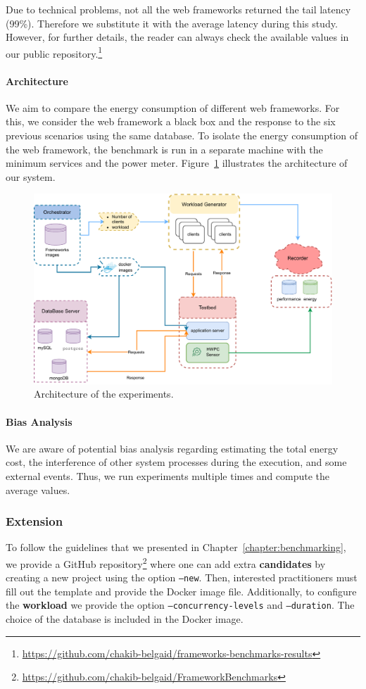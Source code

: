 Due to technical problems, not all the web frameworks returned the tail latency (99\%). Therefore we substitute it with the average latency during this study.
However, for further details, the reader can always check the available values in our public repository.\footnote{\url{https://github.com/chakib-belgaid/frameworks-benchmarks-results}}


\paragraph{Architecture}
We aim to compare the energy consumption of different web frameworks.
For this, we consider the web framework a black box and the response to the six previous scenarios using the same database.
To isolate the energy consumption of the web framework, the benchmark is run in a separate machine with the minimum services and the power meter.
Figure~\ref{fig:architecture} illustrates the architecture of our system.

\begin{figure}[bht]
    \centering
    \includegraphics[width=.8\columnwidth]{imgs/architecture}
    \caption[Architecture]{Architecture of the experiments.}
    \label{fig:architecture}
\end{figure}


\paragraph{Bias Analysis}
We are aware of potential bias analysis regarding estimating the total energy cost, the interference of other system processes during the execution, and some external events.
Thus, we run experiments multiple times and compute the average values.

\subsubsection{Extension}
To follow the guidelines that we presented in Chapter~\ref{chapter:benchmarking}, we provide a GitHub repository\footnote{\url{https://github.com/chakib-belgaid/FrameworkBenchmarks}} where one can add extra \textbf{candidates} by creating a new project using the option \texttt{--new}.
Then, interested practitioners must fill out the template and provide the Docker image file.
Additionally, to configure the \textbf{workload} we provide the option \texttt{--concurrency-levels} and \texttt{--duration}.
The choice of the database is included in the Docker image.

